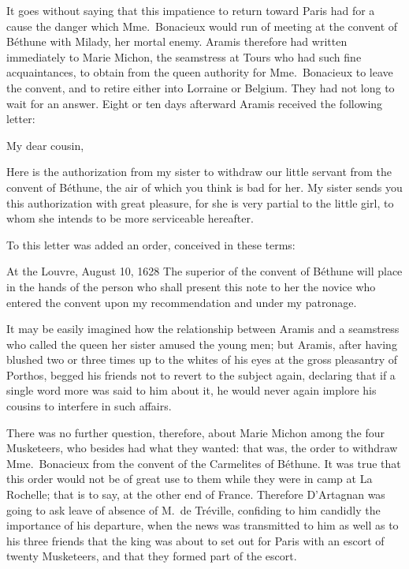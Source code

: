 It goes without saying that this impatience to return toward Paris had for a cause the danger which Mme.~Bonacieux would run of meeting at the convent of Béthune with Milady, her mortal enemy. Aramis therefore had written immediately to Marie Michon, the seamstress at Tours who had such fine acquaintances, to obtain from the queen authority for Mme.~Bonacieux to leave the convent, and to retire either into Lorraine or Belgium. They had not long to wait for an answer. Eight or ten days afterward Aramis received the following letter: 

\begin{mail}{}{My dear cousin,}
	
Here is the authorization from my sister to withdraw our little servant from the convent of Béthune, the air of which you think is bad for her. My sister sends you this authorization with great pleasure, for she is very partial to the little girl, to whom she intends to be more serviceable hereafter. 

\end{mail}

To this letter was added an order, conceived in these terms: 

\begin{mail}{At the Louvre, August 10, 1628}{}
The superior of the convent of Béthune will place in the hands of the person who shall present this note to her the novice who entered the convent upon my recommendation and under my patronage. 
\end{mail}

It may be easily imagined how the relationship between Aramis and a seamstress who called the queen her sister amused the young men; but Aramis, after having blushed two or three times up to the whites of his eyes at the gross pleasantry of Porthos, begged his friends not to revert to the subject again, declaring that if a single word more was said to him about it, he would never again implore his cousins to interfere in such affairs. 

There was no further question, therefore, about Marie Michon among the four Musketeers, who besides had what they wanted: that was, the order to withdraw Mme.~Bonacieux from the convent of the Carmelites of Béthune. It was true that this order would not be of great use to them while they were in camp at La Rochelle; that is to say, at the other end of France. Therefore D'Artagnan was going to ask leave of absence of M.~de Tréville, confiding to him candidly the importance of his departure, when the news was transmitted to him as well as to his three friends that the king was about to set out for Paris with an escort of twenty Musketeers, and that they formed part of the escort. 


